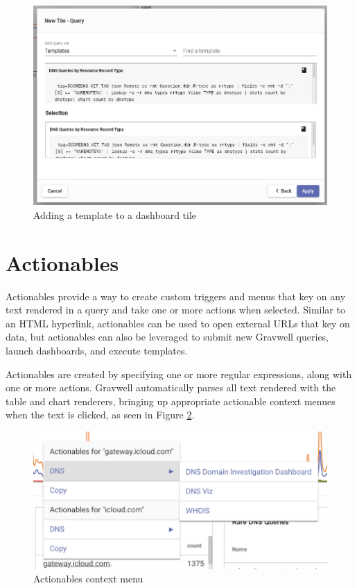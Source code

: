 \begin{figure}[H]
	\includegraphics[width=0.8\linewidth]{images/dashboard-template.png}
	\caption{Adding a template to a dashboard tile}
	\label{fig:dashboard-template}
\end{figure}

\section{Actionables}
\label{sec:actionables}

Actionables provide a way to create custom triggers and menus that key on any text rendered in a query and take one or more actions when selected. Similar to an HTML hyperlink, actionables can be used to open external URLs that key on data, but actionables can also be leveraged to submit new Gravwell queries, launch dashboards, and execute templates.

Actionables are created by specifying one or more regular expressions, along with one or more actions. Gravwell automatically parses all text rendered with the table and chart renderers, bringing up appropriate actionable context menues when the text is clicked, as seen in Figure \ref{fig:actionables-overview}.

\begin{figure}[H]
	\includegraphics[width=0.6\linewidth]{images/actionables-overview.png}
	\caption{Actionables context menu}
	\label{fig:actionables-overview}
\end{figure}

